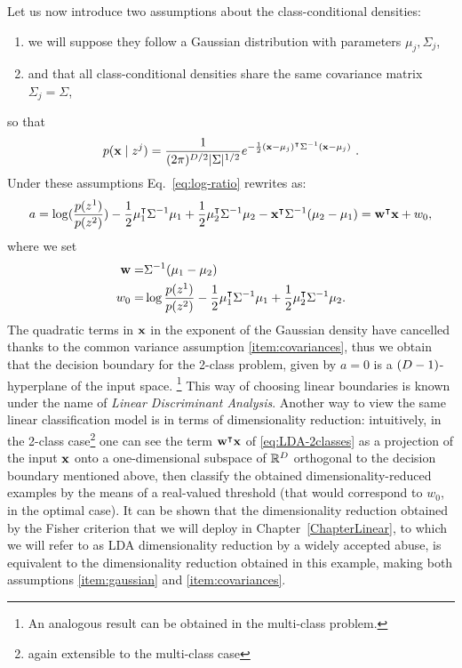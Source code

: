 Let us now introduce two assumptions about the class-conditional densities:
\begin{enumerate}[label=(\roman*)]
\item \label{item:gaussian} we will suppose they follow a Gaussian distribution with parameters $\mu_j, \Sigma_j$,
\item \label{item:covariances} and that all class-conditional densities share the same covariance matrix $\Sigma_j=\Sigma$,
\end{enumerate}
so that
\begin{equation}
p(\textbf{x}\mid z^j) = \frac{1}{(2\pi)^{{D}/2}\lvert \Sigma\rvert^{1/2}}e^{-\frac{1}{2}(\textbf{x}- \mu_j)^\intercal\Sigma^{-1}(\textbf{x}- \mu_j)} \mbox{ .}
\end{equation}
Under these assumptions Eq.~\eqref{eq:log-ratio} rewrites as: 
\begin{equation}\label{eq:LDA-2classes}
a = \log(\frac{p(z^1)}{p(z^2)}) - \frac{1}{2}\mu_1^\intercal\Sigma^{-1}\mu_1 + \frac{1}{2}\mu_2^\intercal\Sigma^{-1}\mu_2 - \textbf{x}^\intercal\Sigma^{-1}(\mu_2-\mu_1) = \textbf{w}^\intercal \textbf{x} + w_0, 
\end{equation}
where we set 
\begin{align*}
\textbf{w} =& \Sigma^{-1}(\mu_1-\mu_2)\\
w_0 =  & \log\frac{p(z^1)}{p(z^2)} - \frac{1}{2}\mu_1^\intercal\Sigma^{-1}\mu_1 + \frac{1}{2}\mu_2^\intercal\Sigma^{-1}\mu_2 . 
\end{align*}
The quadratic terms in $\textbf{x}$ in the exponent of the Gaussian density have cancelled thanks to the common variance assumption \ref{item:covariances}, thus we obtain that the decision boundary for the 2-class problem, given by $a=0$ is a $(D - 1)$-hyperplane of the input space. \footnote{An analogous result can be obtained in the multi-class problem.} This way of choosing linear boundaries is known under the name of \emph{Linear Discriminant Analysis}. Another way to view the same linear classification model is in terms of dimensionality reduction: intuitively, in the 2-class case\footnote{again extensible to the multi-class case} one can see the term $\textbf{w}^\intercal \textbf{x}$ of \eqref{eq:LDA-2classes} as a projection of the input $\textbf{x}$ onto a one-dimensional subspace of $\mathbb{R}^D$ orthogonal to the decision boundary mentioned above, then classify the obtained dimensionality-reduced examples by the means of a real-valued threshold (that would correspond to $w_0$, in the optimal case). It can be shown that the dimensionality reduction obtained by the Fisher criterion that we will deploy in Chapter~\ref{ChapterLinear}, to which we will refer to as LDA dimensionality reduction by a widely accepted abuse, is equivalent to the dimensionality reduction obtained in this example, making both assumptions \ref{item:gaussian} and \ref{item:covariances}.  \\
